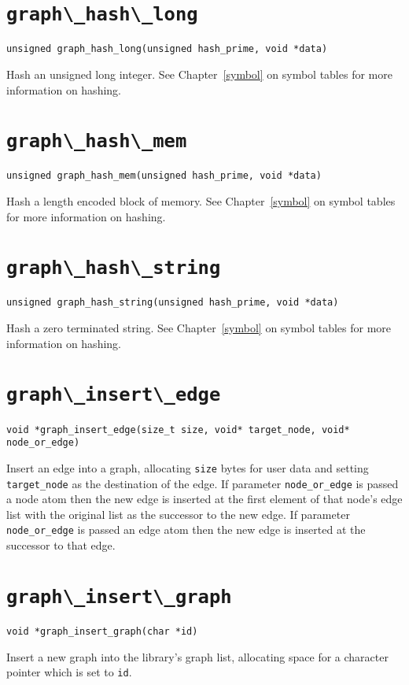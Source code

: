 \section{\protect\verb+graph\_hash\_long+}
\begin{verbatim}
unsigned graph_hash_long(unsigned hash_prime, void *data)
\end{verbatim}
Hash an unsigned long integer. See Chapter~\ref{symbol} on symbol tables for more
information on hashing.

\section{\protect\verb+graph\_hash\_mem+}
\begin{verbatim}
unsigned graph_hash_mem(unsigned hash_prime, void *data)
\end{verbatim}
Hash a length encoded block of memory. See Chapter~\ref{symbol} on symbol tables for more
information on hashing.

\section{\protect\verb+graph\_hash\_string+}
\begin{verbatim}
unsigned graph_hash_string(unsigned hash_prime, void *data)
\end{verbatim}
Hash a zero terminated string. See Chapter~\ref{symbol} on symbol tables for more
information on hashing.

\section{\protect\verb+graph\_insert\_edge+}
\begin{verbatim}
void *graph_insert_edge(size_t size, void* target_node, void* node_or_edge)
\end{verbatim}
Insert an edge into a graph, allocating {\tt size} bytes for user data
and setting \verb+target_node+ as the destination of the edge. If
parameter \verb+node_or_edge+ is passed a node atom then the new edge is
inserted at the first element of that node's edge list with the original
list as the successor to the new edge. If parameter \verb+node_or_edge+
is passed an edge atom then the new edge is inserted at the successor to
that edge.

\section{\protect\verb+graph\_insert\_graph+}
\begin{verbatim}
void *graph_insert_graph(char *id)
\end{verbatim}
Insert a new graph into the library's graph list, allocating space for a character
pointer which is set to {\tt id}.

